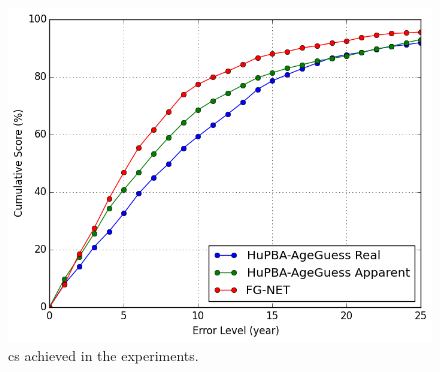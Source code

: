\begin{figure}[!h]
	\centering
	\includegraphics[width=\textwidth]{figures/cum_score}
	\caption{\gls{cs} achieved in the experiments.}
	\label{fig:cumS}
\end{figure}
